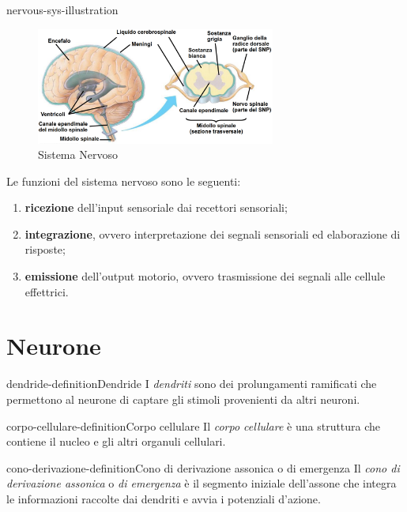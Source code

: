 \documentclass[preview]{standalone}
\begin{document}
\begin{snippet}{nervous-sys-illustration}
    \setlength{\intextsep}{0pt}%
    \begin{figure}
        \includegraphics[width=0.7\textwidth]{./resources/nervous_system.png}
        \caption{Sistema Nervoso}
        \vspace{-1cm}
    \end{figure}
    
    Le funzioni del sistema nervoso sono le seguenti:
    \begin{enumerate}
        \item \textbf{ricezione} dell'input sensoriale dai recettori sensoriali;
        \item \textbf{integrazione}, ovvero interpretazione dei segnali sensoriali ed elaborazione di risposte;
        \item \textbf{emissione} dell'output motorio, ovvero trasmissione dei segnali alle cellule effettrici.
    \end{enumerate}
    
    \wrapfill
\end{snippet}

\section{Neurone}

\begin{snippetdefinition}{dendride-definition}{Dendride}
    I \textit{dendriti} sono dei prolungamenti ramificati che
    permettono al neurone di captare gli stimoli provenienti da altri
    neuroni.
\end{snippetdefinition}

\begin{snippetdefinition}{corpo-cellulare-definition}{Corpo cellulare}
    Il \textit{corpo cellulare} è una struttura che contiene
    il nucleo e gli altri organuli cellulari.
\end{snippetdefinition}

\begin{snippetdefinition}{cono-derivazione-definition}{Cono di derivazione assonica o di emergenza}
    Il \textit{cono di derivazione assonica} o \textit{di emergenza}    
    è il segmento iniziale dell'assone che integra le informazioni
    raccolte dai dendriti e avvia i potenziali d'azione.
\end{snippetdefinition}
\end{document}
